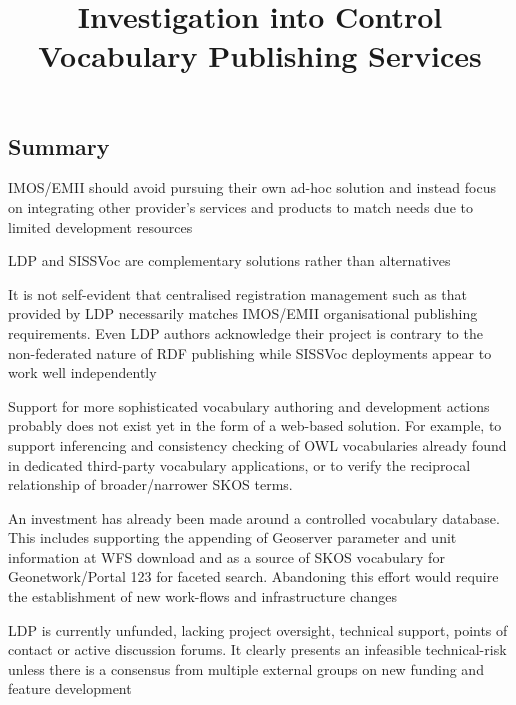\documentclass[10pt,a4paper]{article}
\title{Investigation into Control Vocabulary Publishing Services}
\date{}
\newenvironment{italicquotes}
{\begin{quote}\itshape}
{\end{quote}}
\let\Item\item
\newcommand\SpecialItem{\renewcommand\item[1][]{\Item[\textbullet~\bfseries##1]}}
\begin{document}
\SpecialItem

  \maketitle
    \begin{flushleft}



% 
% 



\section{
	Summary
}

\item[] IMOS/EMII should avoid pursuing their own ad-hoc solution and instead 
focus on integrating other provider's services and products to match needs due 
to limited development resources
\item[] LDP and SISSVoc are complementary solutions rather than alternatives
\item[] It is not self-evident that centralised registration management such as 
that provided by LDP necessarily matches IMOS/EMII organisational publishing 
requirements. Even LDP authors acknowledge their project is contrary to the 
non-federated nature of RDF publishing while SISSVoc deployments appear to work
well independently  

\item[] Support for more sophisticated vocabulary authoring and development 
actions probably does not exist yet in the form of a web-based solution. For 
example, to support inferencing and consistency checking of OWL vocabularies already 
found in dedicated third-party vocabulary applications, or to verify the 
reciprocal relationship of broader/narrower SKOS terms.
\item[] An investment has already been made around a controlled vocabulary 
database. This includes supporting the appending of Geoserver parameter and 
unit information at WFS download and 
as a source of SKOS vocabulary for Geonetwork/Portal 123 for faceted search. 
Abandoning this effort would require the establishment of new work-flows and infrastructure
changes
\item[] LDP is currently unfunded, lacking project oversight, technical 
support, points of contact or active discussion forums. It clearly presents an infeasible technical-risk 
unless there is a consensus from multiple external groups on new funding and 
feature development 



\end{flushleft}
\end{document}
